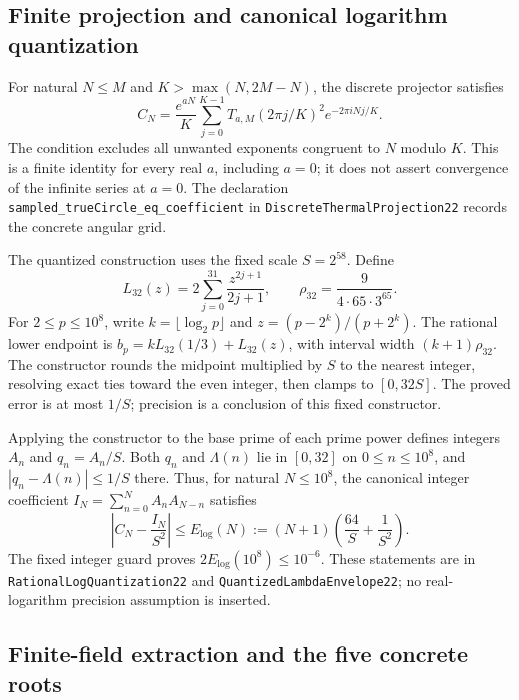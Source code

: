 \subsection{Finite projection and canonical logarithm quantization}

For natural $N\leq M$ and $K>\max(N,2M-N)$, the discrete projector satisfies
\begin{equation}
 C_N=\frac{e^{aN}}{K}\sum_{j=0}^{K-1}
 T_{a,M}(2\pi j/K)^2 e^{-2\pi iNj/K}.
 \label{eq:discrete-projector}
\end{equation}
The condition excludes all unwanted exponents congruent to $N$ modulo $K$.
This is a finite identity for every real $a$, including $a=0$; it does not
assert convergence of the infinite series at $a=0$.
The declaration \nolinkurl{sampled_trueCircle_eq_coefficient}
in \nolinkurl{DiscreteThermalProjection22}
records the concrete angular grid.

The quantized construction uses the fixed scale $S=2^{58}$. Define
\begin{equation}
 L_{32}(z)=2\sum_{j=0}^{31}\frac{z^{2j+1}}{2j+1},\qquad
 \rho_{32}=\frac{9}{4\cdot65\cdot3^{65}}.
\end{equation}
For $2\leq p\leq10^8$, write $k=\lfloor\log_2p\rfloor$ and
$z=(p-2^k)/(p+2^k)$. The rational lower endpoint is
$b_p=kL_{32}(1/3)+L_{32}(z)$, with interval width
$(k+1)\rho_{32}$. The constructor rounds the midpoint multiplied by $S$
to the nearest integer, resolving exact ties toward the even integer,
then clamps to $[0,32S]$. The proved error is at most $1/S$;
precision is a conclusion of this fixed constructor.

Applying the constructor to the base prime of each prime power defines
integers $A_n$ and $q_n=A_n/S$. Both $q_n$ and $\Lambda(n)$ lie in $[0,32]$
on $0\leq n\leq10^8$, and $|q_n-\Lambda(n)|\leq1/S$ there. Thus, for
natural $N\leq10^8$, the canonical integer coefficient
$I_N=\sum_{n=0}^N A_nA_{N-n}$ satisfies
\begin{equation}
 \left|C_N-\frac{I_N}{S^2}\right|
 \leq E_{\log}(N):=(N+1)\left(\frac{64}{S}+\frac1{S^2}\right).
 \label{eq:log-envelope}
\end{equation}
The fixed integer guard proves $2E_{\log}(10^8)\leq10^{-6}$.
These statements are in \nolinkurl{RationalLogQuantization22} and
\nolinkurl{QuantizedLambdaEnvelope22}; no real-logarithm precision
assumption is inserted.

\subsection{Finite-field extraction and the five concrete roots}

